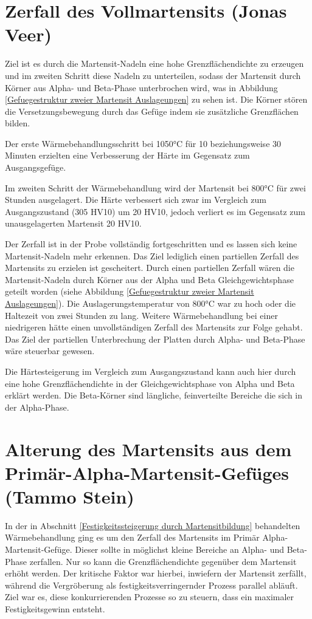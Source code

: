\documentclass[a4paper, 11pt]{tubsreprt}
\begin{document}
\section{Zerfall des Vollmartensits (Jonas Veer)}\label{Kapitel Zerfall des Vollmartensits}

Ziel ist es durch die Martensit-Nadeln eine hohe Grenzflächendichte zu erzeugen und im zweiten Schritt diese Nadeln zu unterteilen, sodass der Martensit durch Körner aus Alpha- und Beta-Phase unterbrochen wird, was in Abbildung \ref{Gefuegestruktur zweier Martensit Auslageungen} zu sehen ist. Die Körner stören die Versetzungsbewegung durch das Gefüge indem sie zusätzliche Grenzflächen bilden.

Der erste Wärmebehandlungsschritt bei 1050°C für 10 beziehungsweise 30 Minuten erzielten eine Verbesserung der Härte im Gegensatz zum Ausgangsgefüge.

Im zweiten Schritt der Wärmebehandlung wird der Martensit bei 800°C für zwei Stunden ausgelagert. Die Härte verbessert sich zwar im Vergleich zum Ausgangszustand (305 HV10) um 20 HV10, jedoch verliert es im Gegensatz zum unausgelagerten Martensit 20 HV10.

Der Zerfall ist in der Probe vollständig fortgeschritten und es lassen sich keine Martensit-Nadeln mehr erkennen. Das Ziel lediglich einen partiellen Zerfall des Martensits zu erzielen ist gescheitert. Durch einen partiellen Zerfall wären die Martensit-Nadeln durch Körner aus der Alpha und Beta Gleichgewichtsphase geteilt worden (siehe Abbildung \ref{Gefuegestruktur zweier Martensit Auslageungen}). Die Auslagerungstemperatur von 800°C war zu hoch oder die Haltezeit von zwei Stunden zu lang. 
Weitere Wärmebehandlung bei einer niedrigeren hätte einen unvollständigen Zerfall des Martensits zur Folge gehabt. Das Ziel der partiellen Unterbrechung der Platten durch Alpha- und Beta-Phase wäre steuerbar gewesen. 

Die Härtesteigerung im Vergleich zum Ausgangszustand kann auch hier durch eine hohe Grenzflächendichte in der Gleichgewichtsphase von Alpha und Beta erklärt werden. Die Beta-Körner sind längliche, feinverteilte Bereiche die sich in der Alpha-Phase.  
\section{Alterung des Martensits aus dem Primär-Alpha-Martensit-Gefüges (Tammo Stein)}
In der in Abschnitt \ref{Festigkeitssteigerung durch Martensitbildung} behandelten Wärmebehandlung ging es um den Zerfall des Martensits im Primär Alpha-Martensit-Gefüge. Dieser sollte in möglichst kleine Bereiche an Alpha- und Beta-Phase zerfallen. Nur so kann die Grenzflächendichte gegenüber dem Martensit erhöht werden. Der kritische Faktor war hierbei, inwiefern der Martensit zerfällt, während die Vergröberung als festigkeitsverringernder Prozess parallel abläuft. Ziel war es, diese konkurrierenden Prozesse so zu steuern, dass ein maximaler Festigkeitsgewinn entsteht. 
\end{document}
